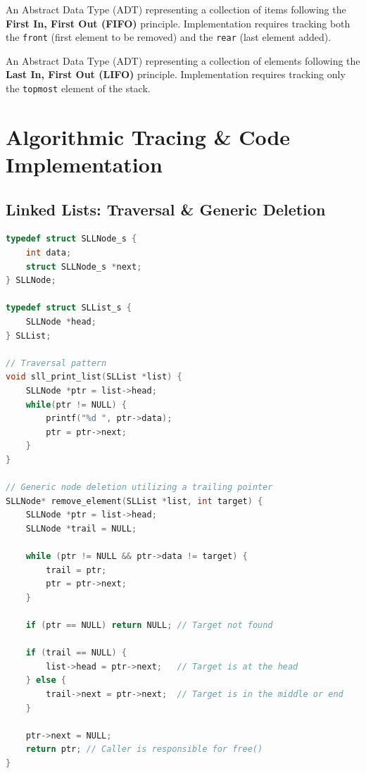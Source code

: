 \begin{definition}[Queue]
An Abstract Data Type (ADT) representing a collection of items following the \textbf{First In, First Out (FIFO)} principle. Implementation requires tracking both the \texttt{front} (first element to be removed) and the \texttt{rear} (last element added).
\end{definition}

\begin{definition}[Stack]
An Abstract Data Type (ADT) representing a collection of elements following the \textbf{Last In, First Out (LIFO)} principle. Implementation requires tracking only the \texttt{topmost} element of the stack.
\end{definition}

\section{Algorithmic Tracing \& Code Implementation}

\subsection{Linked Lists: Traversal \& Generic Deletion}

\begin{lstlisting}[language=C, caption={Linked List Traversal and Deletion}]
typedef struct SLLNode_s {
    int data;
    struct SLLNode_s *next;
} SLLNode;

typedef struct SLList_s {
    SLLNode *head;
} SLList;

// Traversal pattern
void sll_print_list(SLList *list) {
    SLLNode *ptr = list->head;
    while(ptr != NULL) {
        printf("%d ", ptr->data);
        ptr = ptr->next;
    }
}

// Generic node deletion utilizing a trailing pointer
SLLNode* remove_element(SLList *list, int target) {
    SLLNode *ptr = list->head;
    SLLNode *trail = NULL;
    
    while (ptr != NULL && ptr->data != target) {
        trail = ptr;
        ptr = ptr->next;
    }
    
    if (ptr == NULL) return NULL; // Target not found
    
    if (trail == NULL) {
        list->head = ptr->next;   // Target is at the head
    } else {
        trail->next = ptr->next;  // Target is in the middle or end
    }
    
    ptr->next = NULL;
    return ptr; // Caller is responsible for free()
}
\end{lstlisting}

